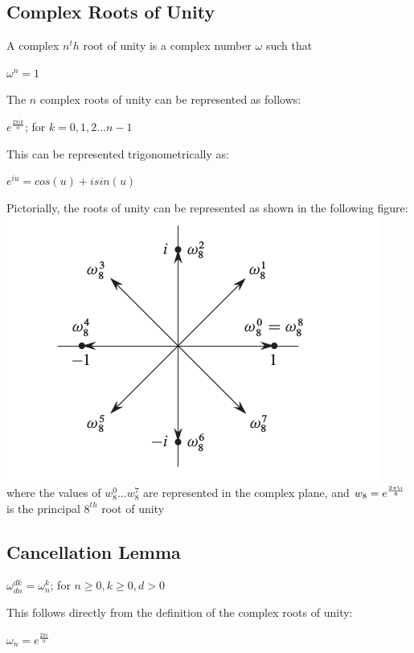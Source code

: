 \documentclass{article}
\begin{document}
\subsection{Complex Roots of Unity}
A complex $n^th$ root of unity is a complex number $\omega$ such that \\
\begin{center}
$\omega^{n}=1$ \\
\end{center}
The $n$ complex roots of unity can be represented as follows:
\begin{center}
$e^{\frac{2\pi ik}{n}}$; for $k=0,1,2...n-1$
\end{center}
This can be represented trigonometrically as:
\begin{center}
$e^{iu}=cos(u)+isin(u)$
\end{center}
Pictorially, the roots of unity can be represented as shown in the following figure: \\
\includegraphics[scale=0.5]{roots} \\
where the values of $w_{8}^{0}...w_{8}^{7}$ are represented in the complex plane, and $w_{8}=e^{\frac{2\pi\i}{8}}$ is the principal $8^{th}$ root of unity

\subsection{Cancellation Lemma}
\begin{center}
$\omega_{dn}^{dk}=\omega_{n}^{k}$; for $n \geq 0, k \geq 0, d>0$ \\
\end{center}
This follows directly from the definition of the complex roots of unity:
\begin{center}
$\omega_{n}=e^{\frac{2\pi i}{n}}$
\end{center} 
\end{document}
